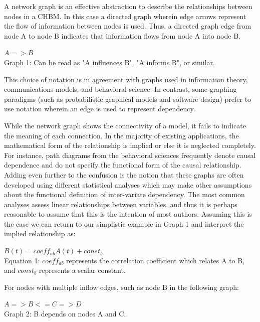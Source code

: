 \documentclass[runningheads,a4paper]{llncs}
\begin{document}
A network graph is an effective abstraction to describe the relationships between nodes in a CHBM.
In this case a directed graph wherein edge arrows represent the flow of information between nodes is used.
Thus, a directed graph edge from node A to node B indicates that information flows from node A into node B. 

\begin{centering}
  $A => B$\\
  \small{Graph 1: Can be read as "A influences B", "A informs B", or similar.}
\end{centering}
  
This choice of notation is in agreement with graphs used in information theory, communications models, and behavioral science.
In contrast, some graphing paradigms (such as probabilistic graphical models and software design) prefer to use notation wherein an edge is used to represent dependency.

While the network graph shows the connectivity of a model, it fails to indicate the meaning of each connection.
In the majority of existing applications, the mathematical form of the relationship is implied or else it is neglected completely.
For instance, path diagrams from the behavioral sciences frequently denote causal dependence and do not specify the functional form of the causal relationship.
Adding even further to the confusion is the notion that these graphs are often developed using different statistical analyses which may make other assumptions about the functional definition of inter-variate dependency.
The most common analyses assess linear relationships between variables, and thus it is perhaps reasonable to assume that this is the intention of most authors.
Assuming this is the case we can return to our simplistic example in Graph 1 and interpret the implied relationship as:

\begin{centering}
$B(t) = coeff_{ab}A(t) + const_b$\\
\small{Equation 1: $coeff_{ab}$ represents the correlation coefficient which relates A to B, and $const_b$ represents a scalar constant.}
\end{centering}

For nodes with multiple inflow edges, such as node B in the following graph:

\begin{centering}
$A => B <= C => D$\\
\small{Graph 2: B depends on nodes A and C.}
\end{centering}
\end{document}
